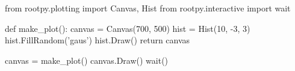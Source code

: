\begin{footnotesize}
\begin{pyglist}[language=python,texcl=true,abovecaptionskip=0,style=vs,bgcolor=Moccasin]
from rootpy.plotting import Canvas, Hist
from rootpy.interactive import wait

def make_plot():
    canvas = Canvas(700, 500)
    hist = Hist(10, -3, 3)
    hist.FillRandom('gaus')
    hist.Draw()
    return canvas

canvas = make_plot()
canvas.Draw()
wait()
\end{pyglist}
\end{footnotesize}
